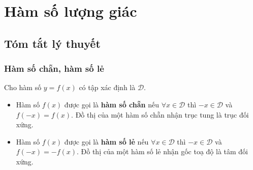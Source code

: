 \setcounter{section}{2}
\section{Hàm số lượng giác}
\subsection{Tóm tắt lý thuyết}
\begin{tomtat}
	\subsubsection{Hàm số chẵn, hàm số lẻ}
	\begin{dn}
	Cho hàm số $y=f(x)$ có tập xác định là $\mathscr{D}$.
	\begin{itemize}
		\item Hàm số $f(x)$ được gọi là \textbf{hàm số chẵn} nếu $\forall x \in \mathscr{D}$ thì $-x \in \mathscr{D}$ và $f(-x)=f(x)$. Đồ thị của một hàm số chẵn nhận trục tung là trục đối xứng.
		\item Hàm số $f(x)$ được gọi là \textbf{hàm số lẻ} nếu $\forall x \in \mathscr{D}$ thì $-x \in \mathscr{D}$ và $f(-x)=-f(x)$. Đồ thị của một hàm số lẻ nhận gốc toạ độ là tâm đối xứng.
	\end{itemize}
	\end{dn}

\end{tomtat}
